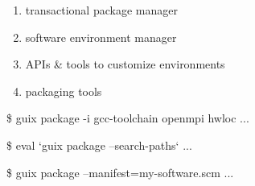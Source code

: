 \documentclass{beamer}
\begin{document}
\begin{frame}
  \LARGE{
    \begin{enumerate}
    \item transactional package manager
    \item software environment manager
    \item APIs \& tools to customize environments
    \item packaging tools
    \end{enumerate}
  }
\end{frame}

\begin{frame}[fragile]

  \begin{semiverbatim}
\$ guix package -i gcc-toolchain openmpi hwloc
\textrm{...}

\$ eval `guix package --search-paths`
\textrm{...}

\$ guix package --manifest=my-software.scm
\textrm{...}
  \end{semiverbatim}

\end{frame}


\end{document}
